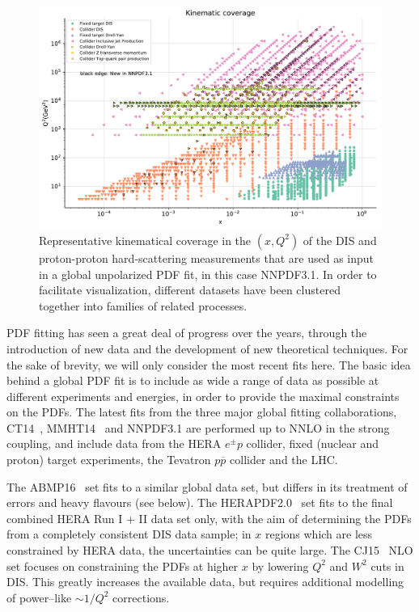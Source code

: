 \begin{figure}[t]
\begin{center}
  \includegraphics[scale=0.60]{plots/kinplot-report.pdf}
  \caption{\small Representative kinematical coverage in the
    $(x,Q^2)$ of the DIS and proton-proton hard-scattering measurements that are
    used as input in a global unpolarized PDF fit, in this case NNPDF3.1.
    In order to facilitate visualization, different
    datasets have been clustered together into families of
    related processes.
    \label{fig:kinplot-report} 
  }
\end{center}
\end{figure}

PDF fitting has seen a great deal of progress over the years, through the introduction of new data and the development of new theoretical techniques. For the sake of brevity, we will only consider the most recent fits here. The basic idea behind a global PDF fit is to include as wide a range of data as possible at different experiments and energies, in order to provide the maximal constraints on the PDFs. The latest fits from the three major global fitting collaborations, CT14~\cite{Dulat:2015mca}, MMHT14~\cite{Harland-Lang:2014zoa} and NNPDF3.1 are performed up to NNLO in the strong coupling, and include data from the HERA $e^{\pm} p$ collider, fixed (nuclear and proton) target experiments, the Tevatron $p\overline{p}$ collider and the LHC. 

The ABMP16~\cite{Alekhin:2017kpj} set fits to a similar global data set, but differs in its treatment of errors and heavy flavours (see below). The HERAPDF2.0~\cite{Abramowicz:2015mha} set fits to the final combined HERA Run I + II data set only, with the aim of determining the PDFs from a completely consistent DIS data sample; in $x$ regions which are less constrained by HERA data, the uncertainties can be quite large. The CJ15~\cite{Accardi:2016qay} NLO set focuses on constraining the PDFs at higher $x$ by lowering $Q^2$ and $W^2$ cuts in DIS. This greatly increases the available data, but requires additional modelling of power--like $\sim 1/Q^2$ corrections.

